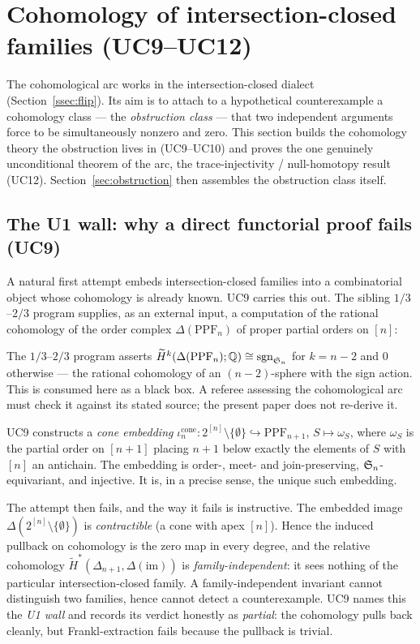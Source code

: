 \section{Cohomology of intersection-closed families (UC9--UC12)}
\label{sec:cohomology}

The cohomological arc works in the intersection-closed dialect
(Section~\ref{ssec:flip}). Its aim is to attach to a hypothetical
counterexample a cohomology class --- the \emph{obstruction class} ---
that two independent arguments force to be simultaneously nonzero and
zero. This section builds the cohomology theory the obstruction lives
in (UC9--UC10) and proves the one genuinely unconditional theorem of
the arc, the trace-injectivity / null-homotopy result (UC12).
Section~\ref{sec:obstruction} then assembles the obstruction class
itself.

\subsection{The U1 wall: why a direct functorial proof fails (UC9)}
\label{ssec:u1-wall}

A natural first attempt embeds intersection-closed families into a
combinatorial object whose cohomology is already known. UC9 carries
this out. The sibling $1/3$--$2/3$ program supplies, as an external
input, a computation of the rational cohomology of the order complex
$\Delta(\mathrm{PPF}_n)$ of proper partial orders on $[n]$:

\begin{remark}
\label{rem:external-input}
The $1/3$--$2/3$ program asserts $\widetilde
H^{k}(\Delta(\mathrm{PPF}_n);\mathbb{Q})\cong\mathrm{sgn}_{\mathfrak{S}_n}$ for $k=n-2$ and
$0$ otherwise --- the rational cohomology of an $(n-2)$-sphere with the
sign action. This is consumed here as a black box. A referee assessing
the cohomological arc must check it against its stated source; the
present paper does not re-derive it.
\end{remark}

UC9 constructs a \emph{cone embedding} $\iota^{\mathrm{cone}}_n\colon
2^{[n]}\setminus\{\emptyset\}\hookrightarrow\mathrm{PPF}_{n+1}$, $S\mapsto
\omega_S$, where $\omega_S$ is the partial order on $[n+1]$ placing
$n+1$ below exactly the elements of $S$ with $[n]$ an antichain. The
embedding is order-, meet- and join-preserving, $\mathfrak{S}_n$-equivariant,
and injective. It is, in a precise sense, the unique such embedding.

The attempt then fails, and the way it fails is instructive. The
embedded image $\Delta(2^{[n]}\setminus\{\emptyset\})$ is
\emph{contractible} (a cone with apex $[n]$). Hence the induced
pullback on cohomology is the zero map in every degree, and the
relative cohomology $\widetilde H^*(\Delta_{n+1},\Delta(\mathrm{im}))$
is \emph{family-independent}: it sees nothing of the particular
intersection-closed family. A family-independent invariant cannot
distinguish two families, hence cannot detect a counterexample. UC9
names this the \emph{U1 wall} and records its verdict honestly as
\emph{partial}: the cohomology pulls back cleanly, but Frankl-extraction
fails because the pullback is trivial.

